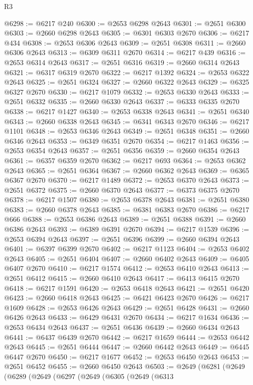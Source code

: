 \begin{lexlean}{R3}
\begin{coremodule}
@6298 := @6217 @240
@6300 := @2653 @6298 @2643
@6301 := @2651 @6300
@6303 := @2660 @6298 @2643
@6305 := @6301 @6303 @2670
@6306 := @6217 @434
@6308 := @2653 @6306 @2643
@6309 := @2651 @6308
@6311 := @2660 @6306 @2643
@6313 := @6309 @6311 @2670
@6314 := @6217 @439
@6316 := @2653 @6314 @2643
@6317 := @2651 @6316
@6319 := @2660 @6314 @2643
@6321 := @6317 @6319 @2670
@6322 := @6217 @1392
@6324 := @2653 @6322 @2643
@6325 := @2651 @6324
@6327 := @2660 @6322 @2643
@6329 := @6325 @6327 @2670
@6330 := @6217 @1079
@6332 := @2653 @6330 @2643
@6333 := @2651 @6332
@6335 := @2660 @6330 @2643
@6337 := @6333 @6335 @2670
@6338 := @6217 @1427
@6340 := @2653 @6338 @2643
@6341 := @2651 @6340
@6343 := @2660 @6338 @2643
@6345 := @6341 @6343 @2670
@6346 := @6217 @1101
@6348 := @2653 @6346 @2643
@6349 := @2651 @6348
@6351 := @2660 @6346 @2643
@6353 := @6349 @6351 @2670
@6354 := @6217 @1463
@6356 := @2653 @6354 @2643
@6357 := @2651 @6356
@6359 := @2660 @6354 @2643
@6361 := @6357 @6359 @2670
@6362 := @6217 @693
@6364 := @2653 @6362 @2643
@6365 := @2651 @6364
@6367 := @2660 @6362 @2643
@6369 := @6365 @6367 @2670
@6370 := @6217 @1489
@6372 := @2653 @6370 @2643
@6373 := @2651 @6372
@6375 := @2660 @6370 @2643
@6377 := @6373 @6375 @2670
@6378 := @6217 @1507
@6380 := @2653 @6378 @2643
@6381 := @2651 @6380
@6383 := @2660 @6378 @2643
@6385 := @6381 @6383 @2670
@6386 := @6217 @666
@6388 := @2653 @6386 @2643
@6389 := @2651 @6388
@6391 := @2660 @6386 @2643
@6393 := @6389 @6391 @2670
@6394 := @6217 @1539
@6396 := @2653 @6394 @2643
@6397 := @2651 @6396
@6399 := @2660 @6394 @2643
@6401 := @6397 @6399 @2670
@6402 := @6217 @1123
@6404 := @2653 @6402 @2643
@6405 := @2651 @6404
@6407 := @2660 @6402 @2643
@6409 := @6405 @6407 @2670
@6410 := @6217 @1574
@6412 := @2653 @6410 @2643
@6413 := @2651 @6412
@6415 := @2660 @6410 @2643
@6417 := @6413 @6415 @2670
@6418 := @6217 @1591
@6420 := @2653 @6418 @2643
@6421 := @2651 @6420
@6423 := @2660 @6418 @2643
@6425 := @6421 @6423 @2670
@6426 := @6217 @1609
@6428 := @2653 @6426 @2643
@6429 := @2651 @6428
@6431 := @2660 @6426 @2643
@6433 := @6429 @6431 @2670
@6434 := @6217 @1634
@6436 := @2653 @6434 @2643
@6437 := @2651 @6436
@6439 := @2660 @6434 @2643
@6441 := @6437 @6439 @2670
@6442 := @6217 @1659
@6444 := @2653 @6442 @2643
@6445 := @2651 @6444
@6447 := @2660 @6442 @2643
@6449 := @6445 @6447 @2670
@6450 := @6217 @1677
@6452 := @2653 @6450 @2643
@6453 := @2651 @6452
@6455 := @2660 @6450 @2643
@6503 := @2649
    (@6281
      (@2649
        (@6289
          (@2649
            (@6297
              (@2649
                (@6305
                  (@2649
                    (@6313

\end{coremodule}
\end{lexlean}
